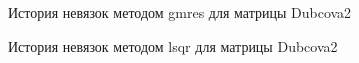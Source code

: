 \begin{figure}[H]
    \renewcommand{\figurename}{Рисунок}
    \caption{История невязок методом gmres для матрицы Dubcova2}
    \label{fig:image_5}
\end{figure}

\begin{figure}[H]
    \renewcommand{\figurename}{Рисунок}
    \caption{История невязок методом lsqr для матрицы Dubcova2}
    \label{fig:image_6}
\end{figure}

